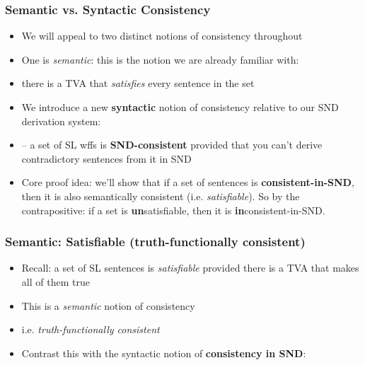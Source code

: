 \begin{frame}
\frametitle{Semantic vs. Syntactic Consistency}

\begin{itemize}[<+->]

\item We will appeal to two distinct notions of consistency throughout

\item One is \emph{semantic}: this is the notion we are already familiar with:

\item[] there is a TVA that \emph{satisfies} every sentence in the set

\item We introduce a new \textbf{syntactic} notion of consistency relative to our SND derivation system: 

\item[] -- a set of SL wffs is \textbf{SND-consistent} provided that you can't derive contradictory sentences from it in SND

\item Core proof idea: we'll show that if a set of sentences is \textbf{consistent-in-SND}, then it is also semantically consistent (i.e. \emph{satisfiable}). So by the contrapositive: if a set is \textbf{\textcolor{OGlyallpink}{un}}satisfiable, then it is \textbf{\textcolor{OGlyallpink}{in}}consistent-in-SND. 

\end{itemize}
\end{frame}


\begin{frame}
\frametitle{Semantic: Satisfiable (truth-functionally consistent)}

\begin{itemize}[<+->]

\item Recall: a set of SL sentences is \emph{satisfiable} provided there is a TVA that makes all of them true


\item This is a \textit{semantic} notion of consistency

\item i.e. \emph{truth-functionally consistent} 


\item Contrast this with the syntactic notion of \textbf{consistency in SND}:

\end{itemize}
\end{frame}




